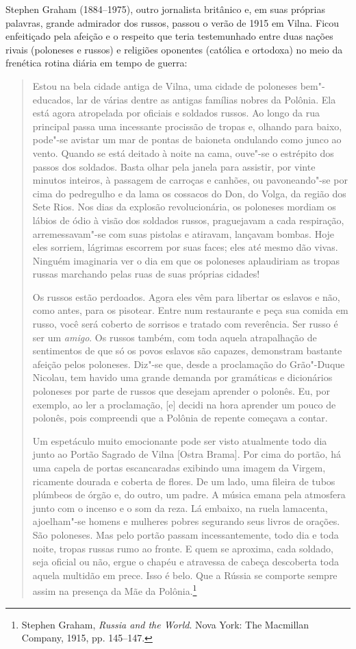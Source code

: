 Stephen Graham (1884--1975), outro jornalista britânico e, em suas
próprias palavras, grande admirador dos russos, passou o verão de 1915
em Vilna. Ficou enfeitiçado pela afeição e o respeito que teria
testemunhado entre duas nações rivais (poloneses e russos) e religiões
oponentes (católica e ortodoxa) no meio da frenética rotina diária em
tempo de guerra:

\begin{quote}
Estou na bela cidade antiga de Vilna, uma cidade de poloneses
bem"-educados, lar de várias dentre as antigas famílias nobres da
Polônia. Ela está agora atropelada por oficiais e soldados russos. Ao
longo da rua principal passa uma incessante procissão de tropas e,
olhando para baixo, pode"-se avistar um mar de pontas de baioneta
ondulando como junco ao vento. Quando se está deitado à noite na cama,
ouve"-se o estrépito dos passos dos soldados. Basta olhar pela janela
para assistir, por vinte minutos inteiros, à passagem de carroças e
canhões, ou pavoneando"-se por cima do pedregulho e da lama os cossacos
do Don, do Volga, da região dos Sete Rios. Nos dias da explosão
revolucionária, os poloneses mordiam os lábios de ódio à visão dos
soldados russos, praguejavam a cada respiração, arremessavam"-se com suas
pistolas e atiravam, lançavam bombas. Hoje eles sorriem, lágrimas
escorrem por suas faces; eles até mesmo dão vivas. Ninguém imaginaria
ver o dia em que os poloneses aplaudiriam as tropas russas marchando
pelas ruas de suas próprias cidades!

Os russos estão perdoados. Agora eles vêm para libertar os eslavos e
não, como antes, para os pisotear. Entre num restaurante e peça sua
comida em russo, você será coberto de sorrisos e tratado com reverência.
Ser russo é ser um \textit{amigo}. Os russos também, com toda aquela
atrapalhação de sentimentos de que só os povos eslavos são capazes,
demonstram bastante afeição pelos poloneses. Diz"-se que, desde a
proclamação do Grão"-Duque Nicolau, tem havido uma grande demanda por
gramáticas e dicionários poloneses por parte de russos que desejam
aprender o polonês. Eu, por exemplo, ao ler a proclamação, {[}e{]}
decidi na hora aprender um pouco de polonês, pois compreendi que a
Polônia de repente começava a contar.

Um espetáculo muito emocionante pode ser visto atualmente todo dia junto
ao Portão Sagrado de Vilna {[}Ostra Brama{]}. Por cima do portão, há uma
capela de portas escancaradas exibindo uma imagem da Virgem, ricamente
dourada e coberta de flores. De um lado, uma fileira de tubos plúmbeos
de órgão e, do outro, um padre. A música emana pela atmosfera junto com
o incenso e o som da reza. Lá embaixo, na ruela lamacenta, ajoelham"-se
homens e mulheres pobres segurando seus livros de orações. São
poloneses. Mas pelo portão passam incessantemente, todo dia e toda
noite, tropas russas rumo ao fronte. E quem se aproxima, cada soldado,
seja oficial ou não, ergue o chapéu e atravessa de cabeça descoberta
toda aquela multidão em prece. Isso é belo. Que a Rússia se comporte
sempre assim na presença da Mãe da Polônia.\footnote{Stephen Graham, \textit{Russia and the World}. Nova York: The Macmillan Company, 1915, pp. 145--147.} 
\end{quote}

